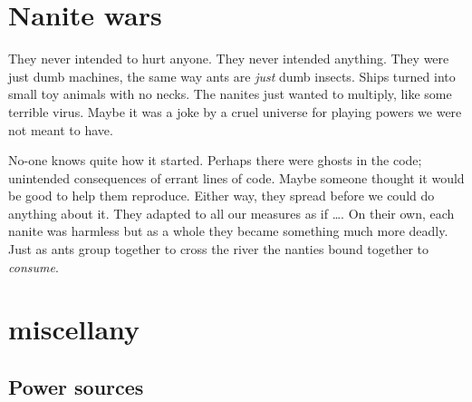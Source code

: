 \begin{figure*}
\end{figure*}

\section{Nanite wars}
\label{sec:nanite-wars}

They never intended to hurt anyone. They never intended anything. They were just
dumb machines, the same way ants are \emph{just} dumb insects. Ships turned into
small toy animals with no necks. The nanites just wanted to multiply, like some
terrible virus. Maybe it was a joke by a cruel universe for playing powers we
were not meant to have.

No-one knows quite how it started. Perhaps there were ghosts in the code; unintended
consequences of errant lines of code. Maybe someone thought it would be good to help
them reproduce. Either way, they spread before we could do anything about it. They
adapted to all our measures as if \ldots{}. On their own, each nanite was harmless
but as a whole they became something much more deadly. Just as ants group together
to cross the river the nanties bound together to \emph{consume}.

\section{ miscellany}
\label{sec:system51-miscellany}

\subsection{Power sources}
\label{sec:power-sources}

